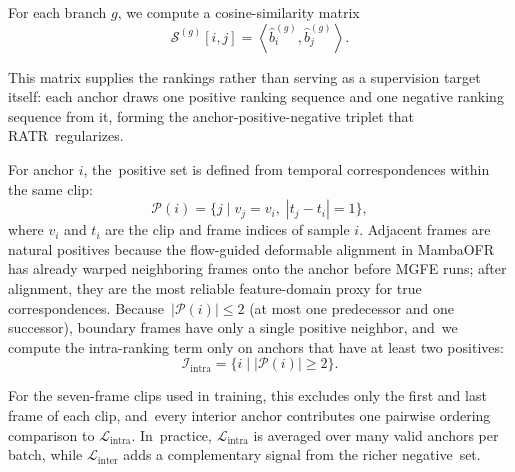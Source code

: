\documentclass[symmetry,article,accept,pdftex,moreauthors]{Definitions/mdpi}
\begin{document}
For each branch $g$, we compute a cosine-similarity matrix
\begin{equation}
\mathcal{S}^{(g)}[i,j] =
\left\langle
\widehat{b}_i^{(g)},
\widehat{b}_j^{(g)}
\right\rangle.
\end{equation}

This matrix supplies the rankings rather than serving as a supervision target itself: each anchor draws one positive ranking sequence and one negative ranking sequence from it, forming the anchor-positive-negative triplet that RATR~regularizes.

For anchor $i$, the~positive set is defined from temporal correspondences within the same clip:
\begin{equation}
\mathcal{P}(i)=
\bigl\{
j \mid v_j=v_i,\;
|t_j-t_i|=1
\bigr\},
\end{equation}
where $v_i$ and $t_i$ are the clip and frame indices of sample $i$. Adjacent frames are natural positives because the flow-guided deformable alignment in MambaOFR has already warped neighboring frames onto the anchor before MGFE runs; after alignment, they are the most reliable feature-domain proxy for true correspondences. Because~$|\mathcal{P}(i)| \le 2$ (at most one predecessor and one successor), boundary frames have only a single positive neighbor, and~we compute the intra-ranking term only on anchors that have at least two positives:
\begin{equation}
\mathcal{I}_{\text{intra}}=
\bigl\{
i \mid |\mathcal{P}(i)| \ge 2
\bigr\}.
\end{equation}

For the seven-frame clips used in training, this excludes only the first and last frame of each clip, and~every interior anchor contributes one pairwise ordering comparison to $\mathcal{L}_{\text{intra}}$. In~practice, $\mathcal{L}_{\text{intra}}$ is averaged over many valid anchors per batch, while $\mathcal{L}_{\text{inter}}$ adds a complementary signal from the richer negative~set.
\end{document}
